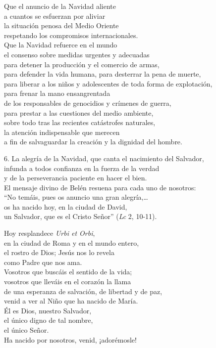 Que el anuncio de la Navidad aliente\\
a cuantos se esfuerzan por aliviar\\
la situación penosa del Medio Oriente\\
respetando los compromisos internacionales.\\
Que la Navidad refuerce en el mundo\\
el consenso sobre medidas urgentes y adecuadas\\
para detener la producción y el comercio de armas,\\
para defender la vida humana, para desterrar la pena de muerte,\\
para liberar a los niños y adolescentes de toda forma de explotación,\\
para frenar la mano ensangrentada\\
de los responsables de genocidios y crímenes de guerra,\\
para prestar a las cuestiones del medio ambiente,\\
sobre todo tras las recientes catástrofes naturales,\\
la atención indispensable que merecen\\
a fin de salvaguardar la creación y la dignidad del hombre.

6. La alegría de la Navidad, que canta el nacimiento del Salvador,\\
infunda a todos confianza en la fuerza de la verdad\\
y de la perseverancia paciente en hacer el bien.\\
El mensaje divino de Belén resuena para cada uno de nosotros:\\
``No temáis, pues os anuncio una gran alegría,\ldots{}\\
os ha nacido hoy, en la ciudad de David,\\
un Salvador, que es el Cristo Señor'' (\emph{Lc} 2, 10-11).

Hoy resplandece \emph{Urbi et Orbi},\\
en la ciudad de Roma y en el mundo entero,\\
el rostro de Dios; Jesús nos lo revela\\
como Padre que nos ama.\\
Vosotros que buscáis el sentido de la vida;\\
vosotros que lleváis en el corazón la llama\\
de una esperanza de salvación, de libertad y de paz,\\
venid a ver al Niño que ha nacido de María.\\
Él es Dios, nuestro Salvador,\\
el único digno de tal nombre,\\
el único Señor.\\
Ha nacido por nosotros, venid, ¡adorémosle!

